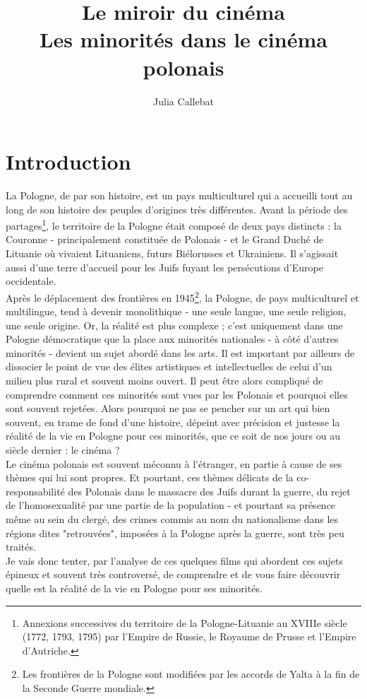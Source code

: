 \documentclass[12pt]{amsart}
\title{Le miroir du cinéma \\ Les minorités dans le cinéma polonais}
\author{Julia Callebat}
\begin{document}
\maketitle

\cleardoublepage
\tableofcontents
\cleardoublepage
\section*{Introduction}
\vspace*{10mm}
La Pologne, de par son histoire, est un pays multiculturel qui a accueilli tout au long de son histoire des peuples d'origines très différentes. Avant la période des partages\footnote{Annexions successives du territoire de la Pologne-Lituanie au XVIIIe siècle (1772, 1793, 1795) par l'Empire de Russie, le Royaume de Prusse et l'Empire d'Autriche.}, le territoire de la Pologne était composé de deux pays distincts : la Couronne - principalement constituée de Polonais - et le Grand Duché de Lituanie où vivaient Lituaniens, futurs Biélorusses et Ukrainiens. Il s'agissait aussi d'une terre d'accueil pour les Juifs fuyant les persécutions d'Europe occidentale. \\
Après le déplacement des frontières en 1945\footnote{Les frontières de la Pologne sont modifiées par les accords de Yalta à la fin de la Seconde Guerre mondiale.}, la Pologne, de pays multiculturel et multilingue, tend à devenir monolithique - une seule langue, une seule religion, une seule origine. Or, la réalité est plus complexe ; c'est uniquement dans une Pologne démocratique que la place aux minorités nationales - à côté d'autres minorités - devient un sujet abordé dans les arts. Il est important par ailleurs de dissocier le point de vue des élites artistiques et intellectuelles de celui d'un milieu plus rural et souvent moins ouvert. Il peut être alors compliqué de comprendre comment ces minorités sont vues par les Polonais et pourquoi elles sont souvent rejetées. Alors pourquoi ne pas se pencher sur un art qui bien souvent, en trame de fond d'une histoire, dépeint avec précision et justesse la réalité de la vie en Pologne pour ces minorités, que ce soit de nos jours ou au siècle dernier : le cinéma ?\\
Le cinéma polonais est souvent méconnu à l'étranger, en partie à cause de ses thèmes qui lui sont propres. Et pourtant, ces thèmes délicats de la co-responsabilité des Polonais dans le massacre des Juifs durant la guerre, du rejet de l'homosexualité par une partie de la population - et pourtant sa présence même au sein du clergé, des crimes commis au nom du nationalisme dans les régions dites "retrouvées", imposées à la Pologne après la guerre, sont très peu traités. \\
Je vais donc tenter, par l'analyse de ces quelques films qui abordent ces sujets épineux et souvent très controversé, de comprendre et de vous faire découvrir quelle est la réalité de la vie en Pologne pour ses minorités. 
\end{document}
